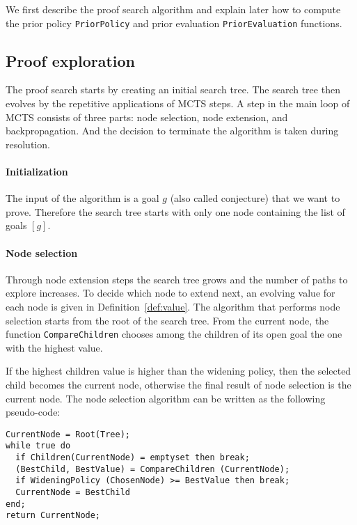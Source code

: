 \documentclass[runningheads,a4paper,draft]{svjour3}
\begin{document}
We first describe the proof search algorithm and explain later how to compute
the prior policy \texttt{PriorPolicy} and prior evaluation
\texttt{PriorEvaluation} functions.

\subsection{Proof exploration}

The proof search starts by creating an initial search tree. The search tree
then evolves by the repetitive applications of MCTS steps. A step in the main
loop of MCTS consists of three parts: node selection, node extension, and
backpropagation. And the decision to terminate the algorithm is taken during
resolution.

\paragraph{Initialization}
The input of the algorithm is a goal $g$ (also called conjecture) that we
want to prove. Therefore the search tree starts with only one node containing
the list of goals
$[g]$.


\paragraph{Node selection}
Through node extension steps the search tree grows and the number of paths to
explore increases. To decide which node to extend next, an evolving value for
each node is given in Definition~\ref{def:value}. The algorithm that performs
node selection starts from the root of the search tree. From the current node,
the function \texttt{CompareChildren} chooses among the children of its open
goal the one with the highest value.

If the highest children value is higher than the widening policy, then the
selected child
becomes the current node, otherwise the final result of node selection is the
current node. The node selection algorithm can be written as the following
pseudo-code:

\begin{lstlisting}[language=SMLSmall]
CurrentNode = Root(Tree);
while true do
  if Children(CurrentNode) = emptyset then break;
  (BestChild, BestValue) = CompareChildren (CurrentNode);
  if WideningPolicy (ChosenNode) >= BestValue then break;
  CurrentNode = BestChild
end;
return CurrentNode;
\end{lstlisting}
\end{document}

